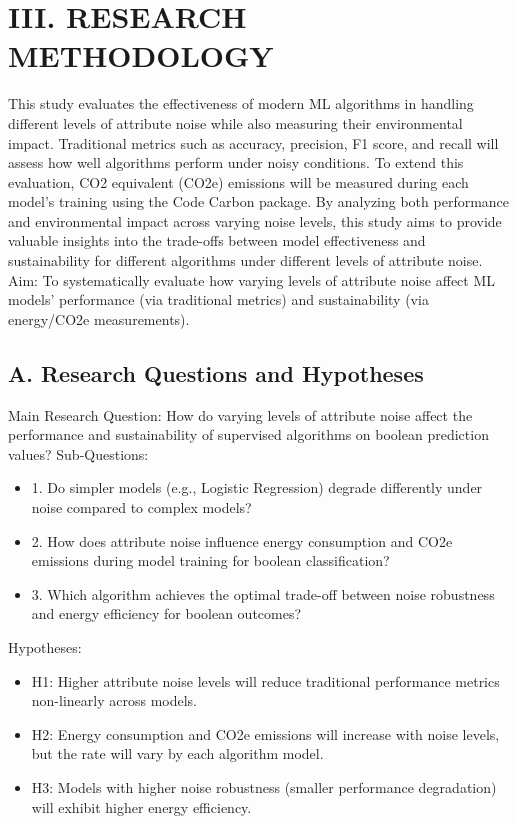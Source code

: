 \documentclass[conference]{IEEEtran}
\begin{document}
\section*{III. RESEARCH METHODOLOGY}
This study evaluates the effectiveness of modern ML algorithms in handling different levels of attribute noise while also measuring their environmental impact. Traditional metrics such as accuracy, precision, F1 score, and recall will assess how well algorithms perform under noisy conditions. To extend this evaluation, CO2 equivalent (CO2e) emissions will be measured during each model's training using the Code Carbon package. By analyzing both performance and environmental impact across varying noise levels, this study aims to provide valuable insights into the trade-offs between model effectiveness and sustainability for different algorithms under different levels of attribute noise.
\newline
\newline
Aim: To systematically evaluate how varying levels of attribute noise affect ML models' performance (via traditional metrics) and sustainability (via energy/CO2e measurements).
\newline

\subsection*{A. Research Questions and Hypotheses}
Main Research Question:
How do varying levels of attribute noise affect the performance and sustainability of supervised algorithms on boolean prediction values?
\newline
\newline
Sub-Questions:
\begin{itemize}
    \item 1. Do simpler models (e.g., Logistic Regression) degrade differently under noise compared to complex models?
    \item 2. How does attribute noise influence energy consumption and CO2e emissions during model training for boolean classification?
    \item 3. Which algorithm achieves the optimal trade-off between noise robustness and energy efficiency for boolean outcomes?
\end{itemize}
\newline
\newline
Hypotheses:
\begin{itemize}
    \item H1: Higher attribute noise levels will reduce traditional performance metrics non-linearly across models.
    \item H2: Energy consumption and CO2e emissions will increase with noise levels, but the rate will vary by each algorithm model.
    \item H3: Models with higher noise robustness (smaller performance degradation) will exhibit higher energy efficiency.
\end{itemize}
\newline
\newline
\end{document}
